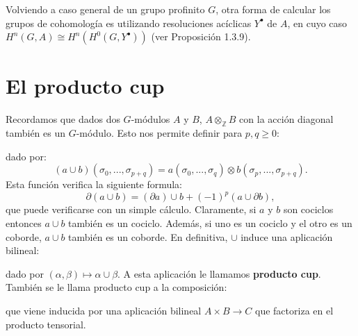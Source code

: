 \documentclass[a4paper,12pt, leqno]{article}
\begin{document}
Volviendo a caso general de un grupo profinito $G$, otra forma de calcular los grupos de cohomología es utilizando resoluciones acíclicas $Y^{\bullet}$ de $A$, en cuyo caso $H^n(G,A)\cong H^n(H^0(G,Y^{\bullet}))$ (ver Proposición 1.3.9).
\section{El producto cup}
Recordamos que dados dos $G$-módulos $A$ y $B$, $A \otimes_{\mathbb{Z}} B$ con la acción diagonal también es un $G$-módulo. Esto nos permite definir para $p,q \geq 0 $:
\begin{center}
\end{center}
dado por:
\begin{equation*}
(a\cup b)(\sigma_0,...,\sigma_{p+q})=a(\sigma_0,...,\sigma_q)\otimes b(\sigma_p,...,\sigma_{p+q}).
\end{equation*}
Esta función verifica la siguiente formula:
\begin{equation*}
\partial(a \cup b)=(\partial a) \cup b + (-1)^p (a\cup \partial b),
\end{equation*}
que puede verificarse con un simple cálculo. Claramente, si $a$ y $b$ son cociclos entonces $a \cup b$ también es un cociclo. Además, si uno es  un cociclo y el otro es un coborde, $a \cup b$ también es un coborde. En definitiva, $\cup$ induce una aplicación bilineal:
\begin{center}
\end{center}
dado por $(\alpha, \beta) \mapsto \alpha \cup \beta$. A esta aplicación le llamamos \textbf{producto cup}. También se le llama producto cup a la composición:
\begin{center}
\end{center}
que viene inducida por una aplicación bilineal $A \times B \rightarrow C$ que factoriza en el producto tensorial. 
\end{document}
